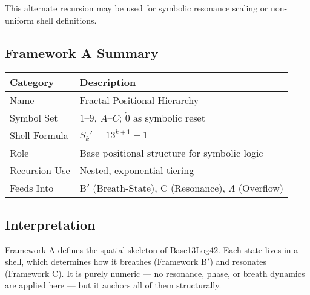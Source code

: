 This alternate recursion may be used for symbolic resonance scaling or non-uniform shell definitions.

\subsection*{Framework A Summary}

\begin{center}
\begin{tabular}{|l|l|}
\hline
\textbf{Category} & \textbf{Description} \\
\hline
Name & Fractal Positional Hierarchy \\
Symbol Set & $1$–$9$, $A$–$C$; $\dot{0}$ as symbolic reset \\
Shell Formula & $S_k' = 13^{k+1} - 1$ \\
Role & Base positional structure for symbolic logic \\
Recursion Use & Nested, exponential tiering \\
Feeds Into & B$'$ (Breath-State), C (Resonance), $\Lambda$ (Overflow) \\
\hline
\end{tabular}
\end{center}

\subsection*{Interpretation}

Framework A defines the spatial skeleton of Base13Log42. Each state lives in a shell, which determines how it breathes (Framework B$'$) and resonates (Framework C). It is purely numeric — no resonance, phase, or breath dynamics are applied here — but it anchors all of them structurally.
